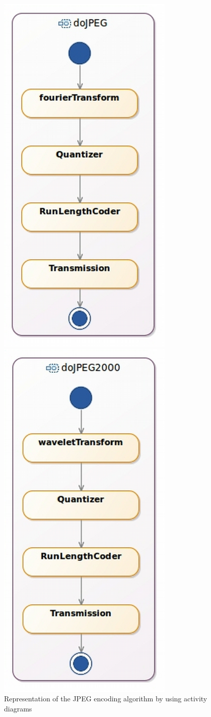 \begin{itemize}
	
	\begin{figure}
		\centering
		\begin{minipage}{0.45\textwidth}
			\centering
			\includegraphics[width=.5\columnwidth]{examples/figs/dojpeg.pdf}
			\caption{Representation of the JPEG encoding algorithm by using activity diagrams}
			\label{fig:dojpeg}
		\end{minipage}\hfill
		\begin{minipage}{0.45\textwidth}
			\centering
			\includegraphics[width=.5\columnwidth]{examples/figs/dojpeg2000.pdf}

\end{minipage}
\end{figure}
\end{itemize}
